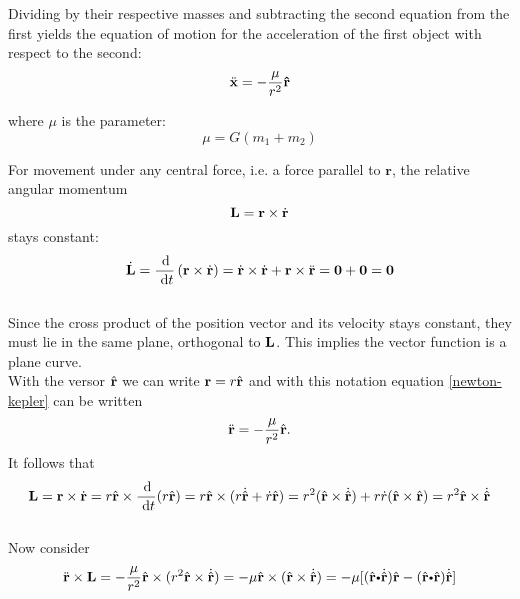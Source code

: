 Dividing by their respective masses and subtracting the second equation
from the first yields the equation of motion for the acceleration of the
first object with respect to the second:
\begin{equation}
  \ddot{\mathbf{ x}} = - \dfrac{\mu}{r^2} \mathbf{\hat{r}} \label{newton-kepler}
\end{equation}


where $\mu$ is the parameter:
\[\mu = G(m_1 + m_2)\]



For movement under any central force, i.e. a force parallel to
$\textbf{r}$, the relative angular momentum
\[\bold{L} = \mathbf{ r} \times {\dot{\mathbf{ r}}}\] stays constant:\\
\[\dot {\bold{L}} = \dfrac{\d}{\dt}\left(\vector{r} \times 
{\dot{\vector{r}}}\right) = \dot{\vector{r}} \times {\dot{\vector{r}}} + 
\vector{r} \times {\ddot{\vector{r}}} =\bold{0} + \bold{0} = \bold{0}\]\\

Since the cross product of the position vector and its velocity stays
constant, they must lie in the same plane, orthogonal to $\bold{L}$.
This implies the vector function is a plane curve.\\


With the versor $\hat{\mathbf{ r}}$ we can write $\mathbf{ r} = r\hat{\mathbf{ r}}$ and with this notation  equation \ref{newton-kepler} can be written
\[\ddot{\mathbf{ r}} = -\dfrac{\mu}{r^2}\hat{\mathbf{ r}}.\] It follows that\\
\[\bold{L} = \vector{r} \times \dot{\vector{r}} = r\hat{\vector{r}} \times 
\dfrac{\d}{\dt}(r\hat{\vector{r}}) = r\hat{\vector{r}} \times 
(r\dot{\hat{\vector{r}}}+\dot{r}\hat{\vector{r}}) = r^2(\hat{\vector{r}} \times \dot{\hat{\vector{r}}}) 
+ r\dot{r}(\hat{\vector{r}} \times \hat{\vector{r}}) = r^2\hat{\vector{r}} \times 
\dot{\hat{\vector{r}}}\]\\
Now consider\\
\[\ddot{\vector{r}} \times \bold{L} = -\dfrac{\mu}{r^2}\hat{\vector{r}} \times 
(r^2\hat{\vector{r}} \times \dot{\hat{\vector{r}}}) = -\mu\hat{\vector{r}} \times (\hat{\vector{r}} 
\times \dot{\hat{\vector{r}}}) = 
-\mu[(\hat{\vector{r}}\bp\dot{\hat{\vector{r}}})\hat{\vector{r}}-(\hat{\vector{r}}\bp\hat{\vector{r}})\dot{
\hat{\vector{r}}}]\]\\

